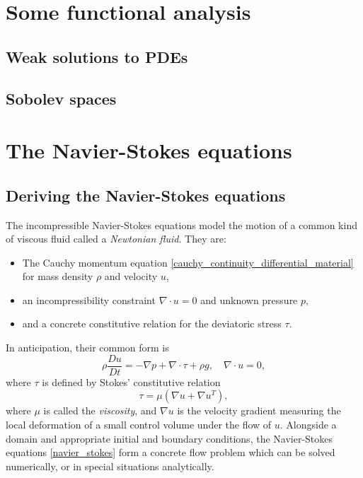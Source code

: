 \documentclass[11pt,a4paper]{memoir}
\begin{document}
\chapter{Some functional analysis}
\section{Weak solutions to PDEs}
\section{Sobolev spaces}

\chapter{The Navier-Stokes equations}
\section{Deriving the Navier-Stokes equations}
The incompressible Navier-Stokes equations model the motion of a common kind of viscous fluid called a \textit{Newtonian fluid}.
They are:
\begin{itemize}
\item The Cauchy momentum equation \eqref{cauchy_continuity_differential_material} for mass density $\rho$ and velocity $u$,
\item an incompressibility constraint $\nabla\cdot u = 0$ and unknown pressure $p$,
\item and a concrete constitutive relation for the deviatoric stress $\tau$.
\end{itemize}
In anticipation, their common form is
\begin{equation}\label{navier_stokes}
    \rho\frac{Du}{Dt} = - \nabla p + \nabla\cdot\tau + \rho g,\quad \nabla\cdot u = 0,
\end{equation}
where $\tau$ is defined by Stokes' constitutive relation
\begin{equation}\label{stokes_constitutive_relation}
    \tau = \mu\left(\nabla u + \nabla u^T\right),
\end{equation}
where $\mu$ is called the \textit{viscosity}, and $\nabla u$ is the velocity gradient measuring the local deformation of a small control volume under
the flow of $u$. Alongside a domain and appropriate initial and boundary conditions, the Navier-Stokes equations \eqref{navier_stokes}
form a concrete flow problem which
can be solved numerically, or in special situations analytically.
\end{document}

